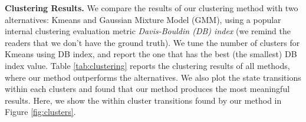 %
{\bf Clustering Results.} We compare the results of our clustering method with two alternatives: Kmeans and Gaussian Mixture Model (GMM), using a popular internal clustering evaluation metric {\it Davis-Bouldin (DB) index} \cite{dbindex} (we remind the readers that we don't have the ground truth). 
We tune the number of clusters for Kmeans using DB index, and report the one that has the best (the smallest) DB index value. 
Table \ref{tab:clustering} reports the clustering results of all methods, 
where our method outperforms the alternatives. We also plot the state transitions within each clusters  
and found that our method produces the most meaningful results. Here, we show the within cluster transitions found by our
method in Figure \ref{fig:clusters}.  


